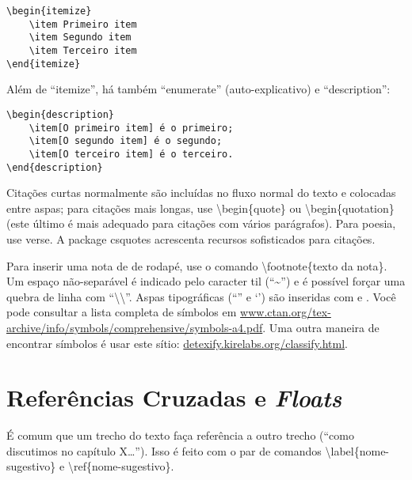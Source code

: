 \begin{verbatim}
\begin{itemize}
    \item Primeiro item
    \item Segundo item
    \item Terceiro item
\end{itemize}
\end{verbatim}

Além de ``itemize'', há também ``enumerate'' (auto-explicativo) e ``description'':

\begin{verbatim}
\begin{description}
    \item[O primeiro item] é o primeiro;
    \item[O segundo item] é o segundo;
    \item[O terceiro item] é o terceiro.
\end{description}
\end{verbatim}

Citações curtas normalmente são incluídas no fluxo normal do texto e colocadas
entre aspas; para citações mais longas, use \textsf{\textbackslash{}begin\{quote\}}
ou \textsf{\textbackslash{}begin\{quotation\}} (este último é mais adequado
para citações com vários parágrafos). Para poesia, use \textsf{verse}. A
package \textsf{csquotes} acrescenta recursos sofisticados para citações.

Para inserir uma nota de de rodapé, use o comando
\textsf{\textbackslash{}footnote\{texto da nota\}}. Um espaço não-separável é
indicado pelo caracter til (``\textasciitilde{}'') e é possível forçar uma
quebra de linha com ``\textbackslash{}\textbackslash{}''. Aspas tipográficas
(``'' e `') são inseridas com
\textasciigrave\textasciigrave\textquotesingle\textquotesingle{} e
\textasciigrave\textquotesingle. Você pode consultar a lista completa de
símbolos em \url{www.ctan.org/tex-archive/info/symbols/comprehensive/symbols-a4.pdf}.
Uma outra maneira de encontrar símbolos é usar este sítio: \url{detexify.kirelabs.org/classify.html}.

\section{Referências Cruzadas e \emph{Floats}}

É comum que um trecho do texto faça referência a outro trecho (``como discutimos
no capítulo X\ldots''). Isso é feito com o par de comandos
\textsf{\textbackslash{}label\{nome-sugestivo\}} e
\textsf{\textbackslash{}ref\{nome-sugestivo\}}.

